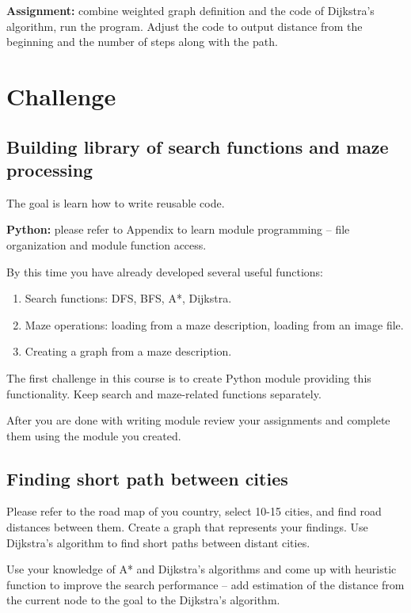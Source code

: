 \begin{tcolorbox}
\textbf{Assignment:} combine weighted graph definition and the code
of Dijkstra's algorithm, run the program. Adjust the code to output
distance from the beginning and the number of steps along with the path.
\end{tcolorbox}

\section{Challenge} 
\subsection{Building library of search functions and maze processing}
The goal is learn how to write reusable code.

\begin{tcolorbox}
\textbf{Python:} please refer to Appendix to learn
module programming -- file organization and module function access.
\end{tcolorbox}

By this time you have already developed several useful functions:
\begin{enumerate}
\item Search functions: DFS, BFS, A*, Dijkstra.
\item Maze operations: loading from a maze description, loading from an image file.
\item Creating a graph from a maze description.
\end{enumerate}

The first challenge in this course is to create Python module providing
this functionality. Keep search and maze-related functions separately.

After you are done with writing module review your assignments 
and complete them using the module you created.

\subsection{Finding short path between cities}

Please refer to the road map of you country, select 10-15 cities, and
find road distances between them. Create a graph that represents your
findings. Use Dijkstra's algorithm to find short paths between distant
cities.

Use your knowledge of A* and Dijkstra's algorithms and come up with
heuristic function to improve the search performance -- add estimation
of the distance from the current node to the goal 
to the Dijkstra's algorithm.

